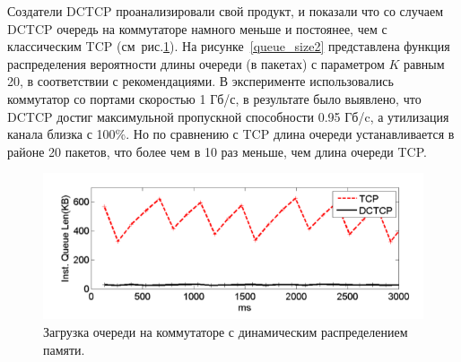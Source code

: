 \documentclass[14pt, a4paper,oneside]{extarticle}
\begin{document}
Создатели DCTCP проанализировали свой продукт, и показали что со случаем DCTCP очередь на коммутаторе намного меньше и постоянее, чем с классическим TCP (см~рис.\ref{queue_size}). 
На рисунке~\ref{queue_size2} представлена функция распределения вероятности длины очереди (в пакетах) с параметром $K$ равным 20, в соответствии с рекомендациями. В эксперименте использовались коммутатор со портами скоростью 1 Гб/с, в результате было выявлено, что DCTCP достиг максимульной пропускной способности 0.95 Гб/c, а утилизация канала близка с 100\%. Но по сравнению с TCP длина очереди устанавливается в районе 20 пакетов, что более чем в 10 раз меньше, чем длина очереди TCP.

\begin{figure}[h]
	\includegraphics[width=0.7\linewidth]{queue_size}
	\caption{Загрузка очереди на коммутаторе с динамическим распределением памяти.}
	\label{queue_size}
\end{figure}
\end{document}
